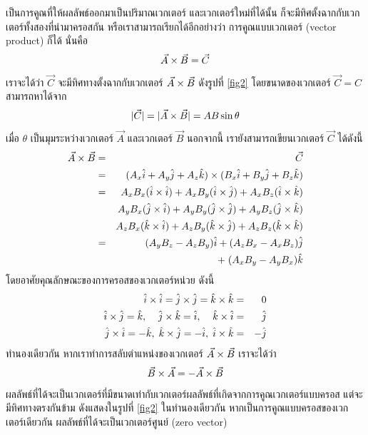 เป็นการคูณที่ให้ผลลัพธ์ออกมาเป็นปริมาณเวกเตอร์ และเวกเตอร์ใหม่ที่ได้นั้น ก็จะมีทิศตั้งฉากกับเวกเตอร์ทั้งสองที่นำมาครอสกัน หรือเราสามารถเรียกได้อีกอย่างว่า การคูณแบบเวกเตอร์ (vector product) ก็ได้ นั่นคือ
\begin{equation}\label{AcrossB}
\vec{A}\times\vec{B} = \vec{C}
\end{equation}
เราจะได้ว่า $\vec{C}$ จะมีทิศทางตั้งฉากกับเวกเตอร์ $\vec{A}\times\vec{B}$ ดังรูปที่ \ref{fig2} โดยขนาดของเวกเตอร์ $\vec{C} = C$ สามารถหาได้จาก
\begin{equation}\label{MagC}
|\vec{C}| = |\vec{A}\times\vec{B}| = AB\sin \theta
\end{equation}
เมื่อ $\theta$ เป็นมุมระหว่างเวกเตอร์ $\vec{A}$ และเวกเตอร์ $\vec{B}$ นอกจากนี้ เรายังสามารถเขียนเวกเตอร์ $\vec{C}$ ได้ดังนี้
\begin{eqnarray}\label{vecC}
\vec{A}\times\vec{B} &=& \vec{C} \nonumber \\
        &=& (A_x\hat{i} + A_y\hat{j} + A_z\hat{k})\times (B_x\hat{i} + B_y\hat{j} + B_z\hat{k}) \nonumber \\
        &=& A_xB_x(\hat{i}\times\hat{i}) + A_xB_y(\hat{i}\times\hat{j}) + A_xB_z(\hat{i}\times\hat{k}) \nonumber \\
        & & A_yB_x(\hat{j}\times\hat{i}) + A_yB_y(\hat{j}\times\hat{j}) + A_yB_z(\hat{j}\times\hat{k}) \nonumber \\
        & & A_zB_x(\hat{k}\times\hat{i}) + A_zB_y(\hat{k}\times\hat{j}) + A_zB_z(\hat{k}\times\hat{k}) \nonumber \\
        &=& (A_yB_z - A_zB_y)\hat{i} + (A_zB_x - A_xB_z)\hat{j} \nonumber \\
        & & +\;(A_xB_y - A_yB_x)\hat{k}
\end{eqnarray}
โดยอาศัยคุณลักษณะของการครอสของเวกเตอร์หน่วย ดังนี้
\begin{eqnarray}\label{eq:CrossUnit}
\hat{i}\times\hat{i} = \hat{j}\times\hat{j} = \hat{k}\times\hat{k} &=& 0 \nonumber \\
\hat{i}\times\hat{j} = \hat{k}, \;\;\;\;\hat{j}\times\hat{k} = \hat{i}, \;\;\;\;\hat{k}\times\hat{i} &=& \hat{j} \\
\hat{j}\times\hat{i} = - \hat{k}, \;\hat{k}\times\hat{j} = - \hat{i}, \;\hat{i}\times\hat{k} &=& - \hat{j} \nonumber
\end{eqnarray}
ทำนองเดียวกัน หากเราทำการสลับตำแหน่งของเวกเตอร์ $\vec{A}\times\vec{B}$ เราจะได้ว่า
\begin{equation}\label{BcrossA}
\vec{B}\times\vec{A} = - \vec{A}\times\vec{B}
\end{equation}
ผลลัพธ์ที่ได้จะเป็นเวกเตอร์ที่มีขนาดเท่ากับเวกเตอร์ผลลัพธ์ที่เกิดจากการคูณเวกเตอร์แบบครอส แต่จะมีทิศทางตรงกันข้าม ดังแสดงในรูปที่ \ref{fig2} ในทำนองเดียวกัน หากเป็นการคูณแบบครอสของเวกเตอร์เดียวกัน ผลลัพธ์ที่ได้จะเป็นเวกเตอร์ศูนย์ (zero vector)

